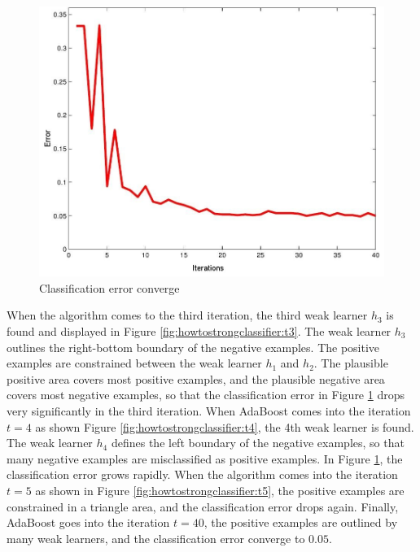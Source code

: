\begin{figure}[ht]
 \begin{center}
  \includegraphics[width=\columnwidth]{ch4/figures/92.jpg}
\caption{Classification error converge}
\label{fig:errorconverge}
 \end{center}
\end{figure} 
When the algorithm comes to the third iteration, the third weak learner $h_{3}$ is found and displayed in \mbox{Figure} \ref{fig:howtostrongclassifier:t3}. The weak learner $h_{3}$ outlines the right-bottom boundary of the negative examples. The positive examples are constrained between the weak learner $h_{1}$ and $h_{2}$. The plausible positive area covers most positive examples, and the plausible negative area covers most negative examples, so that the classification error in \mbox{Figure} \ref{fig:errorconverge} drops very significantly in the third iteration. When AdaBoost comes into the iteration $t=4$ as shown \mbox{Figure} \ref{fig:howtostrongclassifier:t4}, the 4th weak learner is found. The weak learner $h_{4}$ defines the left boundary of the negative examples, so that many negative examples are misclassified as positive examples. In \mbox{Figure} \ref{fig:errorconverge}, the classification error grows rapidly. When the algorithm comes into the iteration $t=5$ as shown in \mbox{Figure} \ref{fig:howtostrongclassifier:t5}, the positive examples are constrained in a triangle area, and the classification error drops again. Finally, AdaBoost goes into the iteration $t=40$, the positive examples are outlined by many weak learners, and the classification error converge to $0.05$.

